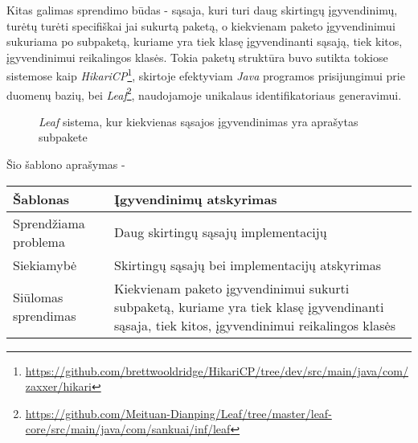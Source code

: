 Kitas galimas sprendimo būdas - sąsaja, kuri turi daug skirtingų įgyvendinimų, turėtų turėti specifiškai jai sukurtą paketą, o kiekvienam paketo
įgyvendinimui sukuriama po subpaketą, kuriame yra tiek klasę įgyvendinanti sąsają, tiek kitos, įgyvendinimui reikalingos klasės.
Tokia paketų struktūra buvo sutikta tokiose sistemose kaip \textit{HikariCP}\footnote{\url{https://github.com/brettwooldridge/HikariCP/tree/dev/src/main/java/com/zaxxer/hikari}},
skirtoje efektyviam \textit{Java} programos prisijungimui prie duomenų bazių, bei
\textit{Leaf}\footnote{\url{https://github.com/Meituan-Dianping/Leaf/tree/master/leaf-core/src/main/java/com/sankuai/inf/leaf}}, naudojamoje unikalaus identifikatoriaus generavimui.

\begin{figure}[H]
    \snugshade
    \endsnugshade
    \caption{\textit{Leaf} sistema, kur kiekvienas sąsajos įgyvendinimas yra aprašytas subpakete}
\end{figure}
Šio šablono aprašymas -
\begin{center}
    \begin{tabular}{|p{5cm}|p{10cm}|}
        \hline
        Šablonas & Įgyvendinimų atskyrimas \\ [0.5ex]
        \hline\hline
        Sprendžiama problema & Daug skirtingų sąsajų implementacijų\\
        \hline
        Siekiamybė &  Skirtingų sąsajų bei implementacijų atskyrimas\\
        \hline
        Siūlomas sprendimas & Kiekvienam paketo įgyvendinimui sukurti subpaketą, kuriame yra tiek klasę įgyvendinanti sąsaja, tiek kitos, įgyvendinimui reikalingos klasės \\
        \hline
    \end{tabular}
\end{center}

